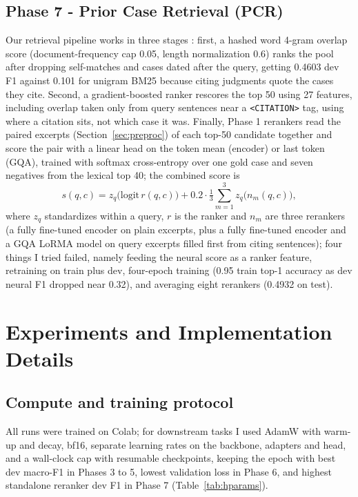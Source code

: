 \documentclass[11pt, oneside]{article}
\begin{document}
\subsection{Phase 7 - Prior Case Retrieval (PCR)}\label{sec:pcr}
Our retrieval pipeline works in three stages \cite{nogueira2019passage}: first, a hashed word 4-gram overlap score (document-frequency cap 0.05, length normalization 0.6) ranks the pool after dropping self-matches and cases dated after the query, getting 0.4603 dev F1 against 0.101 for unigram BM25 \cite{robertson2009bm25} because citing judgments quote the cases they cite. Second, a gradient-boosted ranker \cite{pedregosa2011sklearn,ke2017lightgbm} rescores the top 50 using 27 features, including overlap taken only from query sentences near a \texttt{<CITATION>} tag, using where a citation sits, not which case it was. Finally, Phase 1 rerankers read the paired excerpts (Section~\ref{sec:preproc}) of each top-50 candidate together and score the pair with a linear head on the token mean (encoder) or last token (GQA), trained with softmax cross-entropy over one gold case and seven negatives from the lexical top 40; the combined score is
\begin{equation}
s(q,c) = z_q\big(\mathrm{logit}\,r(q,c)\big) + 0.2\cdot\tfrac{1}{3}\textstyle\sum_{m=1}^{3} z_q\big(n_m(q,c)\big),
\end{equation}
where $z_q$ standardizes within a query, $r$ is the ranker and $n_m$ are three rerankers (a fully fine-tuned encoder on plain excerpts, plus a fully fine-tuned encoder and a GQA LoRMA model on query excerpts filled first from citing sentences); four things I tried failed, namely feeding the neural score as a ranker feature, retraining on train plus dev, four-epoch training (0.95 train top-1 accuracy as dev neural F1 dropped near 0.32), and averaging eight rerankers (0.4932 on test).
\section{Experiments and Implementation Details}
\subsection{Compute and training protocol}
All runs were trained on Colab; for downstream tasks I used AdamW with warm-up and decay, bf16, separate learning rates on the backbone, adapters and head, and a wall-clock cap with resumable checkpoints, keeping the epoch with best dev macro-F1 in Phases 3 to 5, lowest validation loss in Phase 6, and highest standalone reranker dev F1 in Phase 7 (Table~\ref{tab:hparams}).
\end{document}
